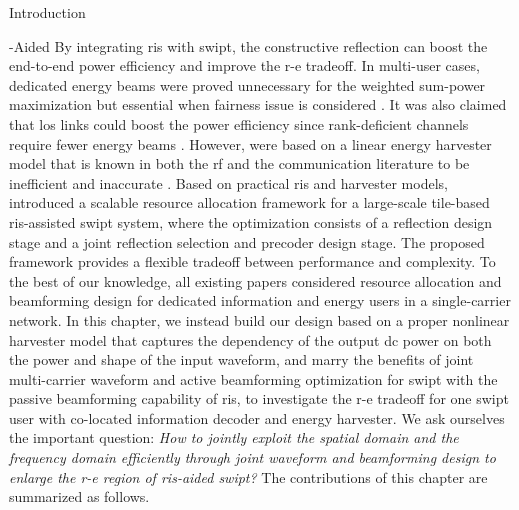 \begin{section}{Introduction}
	\begin{subsection}{-Aided }
		By integrating \gls{ris} with \gls{swipt}, the constructive reflection can boost the end-to-end power efficiency and improve the \gls{r-e} tradeoff. In multi-user cases, dedicated energy beams were proved unnecessary for the weighted sum-power maximization \cite{Wu2020b} but essential when fairness issue is considered \cite{Tang2019}. It was also claimed that \gls{los} links could boost the power efficiency since rank-deficient channels require fewer energy beams \cite{Wu2020a}. However, \cite{Wu2020b,Tang2019,Wu2020a} were based on a linear energy harvester model that is known in both the \gls{rf} and the communication literature to be inefficient and inaccurate \cite{Clerckx2019,Trotter2009,Clerckx2018,Clerckx2016a,Kim2019,Kim2020a,Kim2021,Clerckx2017,Kim2017,Clerckx2018b,Varasteh2020,Varasteh2019d,Varasteh2020a}. Based on practical \gls{ris} and harvester models, \cite{Xu2021c} introduced a scalable resource allocation framework for a large-scale tile-based \gls{ris}-assisted \gls{swipt} system, where the optimization consists of a reflection design stage and a joint reflection selection and precoder design stage. The proposed framework provides a flexible tradeoff between performance and complexity. To the best of our knowledge, all existing papers considered resource allocation and beamforming design for dedicated information and energy users in a single-carrier network. In this chapter, we instead build our design based on a proper nonlinear harvester model that captures the dependency of the output \gls{dc} power on both the power and shape of the input waveform, and marry the benefits of joint multi-carrier waveform and active beamforming optimization for \gls{swipt} with the passive beamforming capability of \gls{ris}, to investigate the \gls{r-e} tradeoff for one \gls{swipt} user with co-located information decoder and energy harvester. We ask ourselves the important question: \emph{How to jointly exploit the spatial domain and the frequency domain efficiently through joint waveform and beamforming design to enlarge the \gls{r-e} region of \gls{ris}-aided \gls{swipt}?} The contributions of this chapter are summarized as follows.


\end{subsection}
\end{section}
